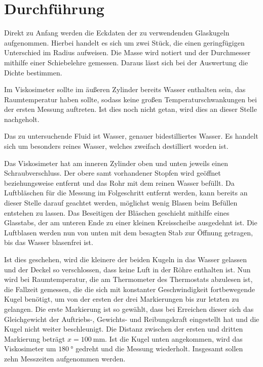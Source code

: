 \section{Durchführung}
\label{sec:Durchführung}

Direkt zu Anfang werden die Eckdaten der zu verwendenden Glaskugeln aufgenommen. Hierbei handelt es sich um zwei Stück, 
die einen geringfügigen Unterschied im Radius aufweisen. 
Die Masse wird notiert und der Durchmesser mithilfe einer Schiebelehre gemessen. 
Daraus lässt sich bei der Auswertung die Dichte bestimmen. 

Im Viskosimeter sollte im äußeren Zylinder bereits Wasser enthalten sein, das Raumtemperatur haben sollte, sodass keine 
großen Temperaturschwankungen bei der ersten Messung auftreten. Ist dies noch nicht getan, wird dies an dieser Stelle nachgeholt. 

Das zu untersuchende Fluid ist Wasser, genauer bidestilliertes Wasser. Es handelt sich um besonders reines Wasser, welches 
zweifach destilliert worden ist. 

Das Viskosimeter hat am inneren Zylinder oben und unten jeweils einen Schraubverschluss. 
Der obere samt vorhandener Stopfen wird geöffnet beziehungsweise entfernt und das Rohr mit dem reinen Wasser befüllt. 
Da Luftbläschen für die Messung im Folgeschritt entfernt werden, kann bereits an dieser Stelle darauf geachtet werden, 
möglichst wenig Blasen beim Befüllen entstehen zu lassen. 
Das Beseitigen der Bläschen geschieht mithilfe eines Glasstabs, der am unteren Ende zu einer kleinen Kreisscheibe ausgedehnt ist. 
Die Luftblasen werden nun von unten mit dem besagten Stab zur Öffnung getragen, bis das Wasser blasenfrei ist. 

Ist dies geschehen, wird die kleinere der beiden Kugeln in das Wasser gelassen und der Deckel so verschlossen, dass keine 
Luft in der Röhre enthalten ist. 
Nun wird bei Raumtemperatur, die am Thermometer des Thermostats abzulesen ist, die Fallzeit gemessen, die die sich mit 
konstanter Geschwindigkeit fortbewegende Kugel benötigt, um von der ersten der drei Markierungen bis zur letzten zu gelangen. 
Die erste Markierung ist so gewählt, dass bei Erreichen dieser sich das Gleichgewicht der Auftriebs-, Gewichts- und 
Reibungskraft eingestellt hat und die Kugel nicht weiter beschleunigt. 
Die Distanz zwischen der ersten und dritten Markierung beträgt $x=\SI{100}{\milli\m}$. 
Ist die Kugel unten angekommen, wird das Viskosimeter um $\SI{180}{\degree}$ gedreht und die Messung wiederholt. 
Insgesamt sollen zehn Messzeiten aufgenommen werden. 

